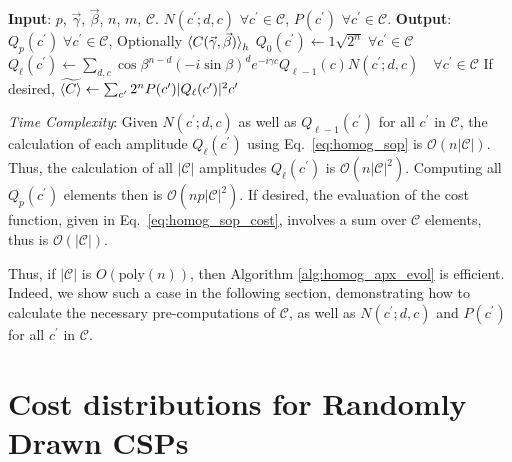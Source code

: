 \documentclass[superscriptaddress,pra,aps,10pt,longbibliography,notitlepage]{revtex4-1}
\newcommand*\cp{c^\prime}
\begin{document}
\begin{algorithm}
\caption{Classical Homogeneous Proxy for QAOA}\label{alg:homog_apx_evol}
\begin{algorithmic}
\STATE \textbf{Input}: $p$, $\vec{\gamma}$, $\vec{\beta}$, $n$, $m$, $\mathcal{C}$. $N(\cp;d,c)$ $\forall \cp\in \mathcal{C}$, $P(\cp)$ $\forall \cp\in \mathcal{C}$. 
\STATE \textbf{Output}: $Q_p(\cp) \; \forall \cp\in \mathcal{C}$, Optionally $\braket{C(\vec{\gamma},\vec{\beta})}_h$
\STATE $Q_0(\cp) \gets 1\sqrt{2^n} \; \forall \cp \in \mathcal{C}$
    \STATE $Q_{\ell}(\cp) \gets \sum_{d,c}  \cos\beta^{n-d}(-i\sin\beta)^d e^{-i\gamma c} Q_{\ell-1}(c) N(\cp;d,c) \quad \forall \cp \in \mathcal{C}$
\ENDFOR
\STATE If desired, $\widetilde{\braket{C}} \gets \sum_{\cp}  2^n P(\cp)|Q_{\ell}(\cp)|^2 \cp$
\\\hrulefill
\end{algorithmic}
\end{algorithm}

\emph{Time Complexity}: Given $N(\cp;d,c)$ as well as  $Q_{\ell-1}(\cp)$ for all $\cp$ in $\mathcal{C}$, the calculation of each amplitude $Q_{\ell}(\cp)$ using Eq.~\eqref{eq:homog_sop} is $\mathcal{O}(n|\mathcal{C}|)$. Thus, the calculation of all $|\mathcal{C}|$ amplitudes $Q_{\ell}(\cp)$ is $\mathcal{O}(n|\mathcal{C}|^2)$. Computing all $Q_{p}(\cp)$ elements then is $\mathcal{O}(n p |\mathcal{C}|^2)$. If desired, the evaluation of the cost function, given in Eq.~\eqref{eq:homog_sop_cost}, involves a sum over $\mathcal{C}$ elements, thus is $\mathcal{O}(|\mathcal{C}|)$.

Thus, if $|\mathcal{C}|$ is $O(\mathrm{poly}(n))$, then Algorithm \ref{alg:homog_apx_evol} is efficient. Indeed, we show such a case in the following section, demonstrating how to calculate the necessary pre-computations of $\mathcal{C}$, as well as $N(\cp;d,c)$ and $P(\cp)$ for all $\cp$ in $\mathcal{C}$.


\section{Cost distributions for Randomly Drawn CSPs}
\label{n_dists_random}
\end{document}
